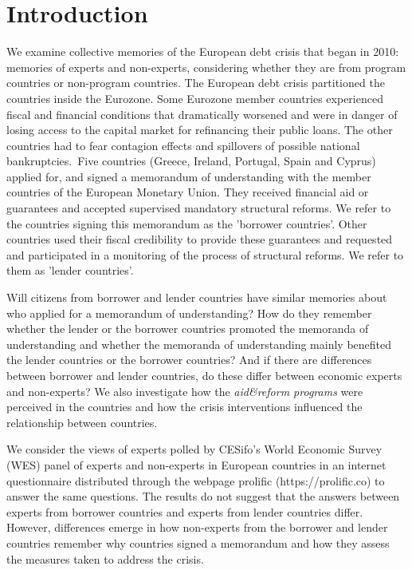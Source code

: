 \section{Introduction}

We examine collective memories of the European debt crisis that
began in 2010: memories of experts and non-experts, considering whether they are from program countries or non-program countries.
The European debt crisis partitioned the countries inside the Eurozone. Some
Eurozone member countries experienced fiscal and financial conditions that
dramatically worsened and were in danger of losing access to the capital
market for refinancing their public loans. The other countries had to
fear contagion effects and spillovers of possible national
bankruptcies.\ Five countries
(Greece, Ireland, Portugal, Spain and Cyprus) applied for, and signed a
memorandum of understanding with the member countries of the European
Monetary Union. They received financial aid or
guarantees and accepted supervised mandatory structural reforms. We refer to the
countries signing this memorandum as the 'borrower countries'. Other countries used their fiscal credibility to provide these guarantees and requested
and participated in a monitoring of the process of structural reforms. We
refer to them as 'lender countries'.

Will citizens from borrower and lender countries have similar memories about who
applied for a memorandum of understanding? How do they remember
whether the lender or the borrower countries promoted the memoranda of understanding and whether
the memoranda of understanding mainly benefited the lender countries or the
borrower countries? And if there are differences between borrower and lender countries, do these differ between economic experts and non-experts? We also
investigate how the \textit{aid\&reform programs} were perceived in the countries
and how the crisis interventions influenced the relationship between
countries.\ 

We consider the views of experts polled by CESifo's World Economic Survey (WES) panel of experts and non-experts in European countries in an internet questionnaire distributed through the webpage prolific (https://prolific.co) to answer the same questions. The results do not suggest that the answers between experts from borrower countries and experts from lender countries differ. However, differences emerge in how non-experts from the borrower and lender countries remember why countries signed a memorandum and how they assess the measures taken to address the crisis. 

